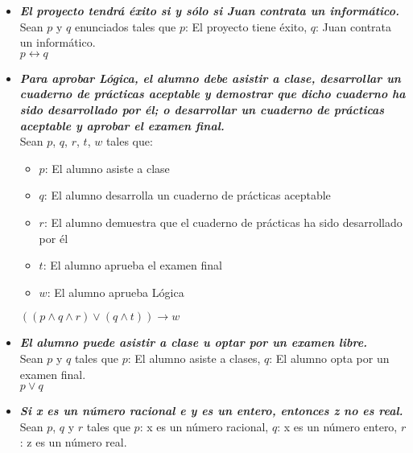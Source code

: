 \documentclass[lnbip]{svmultln}
\begin{document}
\begin{itemize}
  \item \textbf{\textit{El proyecto tendrá éxito si y sólo si Juan contrata un informático.}} \\

  Sean $p$ y $q$ enunciados tales que $p$: El proyecto tiene éxito, $q$: Juan contrata un informático. \\

  $p \leftrightarrow q$ \\

  \item \textbf{\textit{Para aprobar Lógica, el alumno debe asistir a clase, desarrollar un cuaderno
de prácticas aceptable y demostrar que dicho cuaderno ha sido desarrollado
por él; o desarrollar un cuaderno de prácticas aceptable y aprobar
el examen final.}} \\

  Sean $p$, $q$, $r$, $t$, $w$ tales que:

  \begin{itemize}
    \item $p$: El alumno asiste a clase
    \item $q$: El alumno desarrolla un cuaderno de prácticas aceptable
    \item $r$: El alumno demuestra que el cuaderno de prácticas ha sido desarrollado por él
    \item $t$: El alumno aprueba el examen final
    \item $w$: El alumno aprueba Lógica \\
  \end{itemize}

  $((p \wedge q \wedge r) \vee (q \wedge t)) \rightarrow w$ \\

  \item \textbf{\textit{El alumno puede asistir a clase u optar por un examen libre.}} \\

  Sean $p$ y $q$ tales que $p$: El alumno asiste a clases, $q$: El alumno opta por un examen final. \\

  $p \vee q$ \\

  \item \textbf{\textit{Si x es un número racional e y es un entero, entonces z no es real.}} \\

  Sean $p$, $q$ y $r$ tales que $p$: x es un número racional, $q$: x es un número entero, $r$: z es un número real. \\


\end{itemize}
\end{document}
